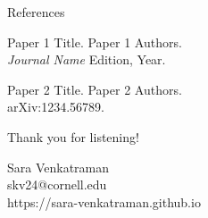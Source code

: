 \documentclass[dvipsnames, handout]{beamer}
\newcommand{\1}{\mathds{1}}	%
\begin{document}
    \begin{frame}{References}
        \begin{thebibliography}{10}
            \beamertemplatearticlebibitems
            {\small

            Paper 1 Title.
            \newblock Paper 1 Authors. \\
            {\it Journal Name} Edition, Year.

            Paper 2 Title.
            \newblock Paper 2 Authors.\\
            arXiv:1234.56789.
            }
        \end{thebibliography}
    \end{frame}


    \begin{frame}
        \begin{center}
        {\large\color{titleText} Thank you for listening!}
            \vspace{1cm}

            Sara Venkatraman \\[1em]
            skv24@cornell.edu \\
            https://sara-venkatraman.github.io
        \end{center}
    \end{frame}

\end{document}
